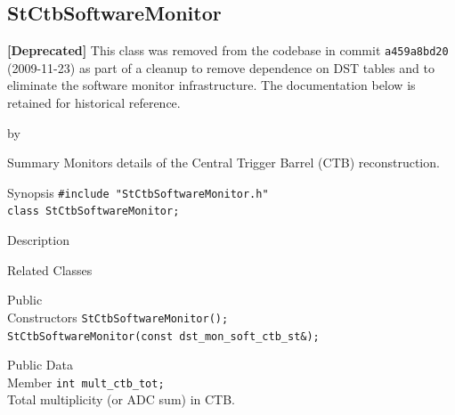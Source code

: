 \documentclass[twoside]{article}
\newcommand{\entrylabel}[1]{\mbox{\textbf{{#1}}}\hfil}%
\newenvironment{entry}
{\begin{list}{}%
    {\renewcommand{\makelabel}{\entrylabel}%
     \setlength{\labelwidth}{90pt}%
     \setlength{\leftmargin}{\labelwidth}
     \advance\leftmargin by \labelsep%
      }%
    }%
  {\end{list}}
\newcommand{\Entrylabel}[1]%
{\raisebox{0pt}[1ex][0pt]{\makebox[\labelwidth][l]%
    {\parbox[t]{\labelwidth}{\hspace{0pt}\textbf{{#1}}}}}}
\newenvironment{Entry}%
{\renewcommand{\entrylabel}{\Entrylabel}\begin{entry}}%
  {\end{entry}}
\begin{document}
\subsection{StCtbSoftwareMonitor}
\label{sec:StCtbSoftwareMonitor}
\textbf{[Deprecated]} This class was removed from the codebase in commit
\texttt{a459a8bd20} (2009-11-23) as part of a cleanup to remove dependence on
DST tables and to eliminate the software monitor infrastructure.
The documentation below is retained for historical reference.

\begin{Entry}
\item[Summary] Monitors details of the Central Trigger Barrel (CTB)
    reconstruction.
\item[Synopsis]
    \verb+#include "StCtbSoftwareMonitor.h"+\\
    \verb+class StCtbSoftwareMonitor;+\\
\item[Description]
\item[Related Classes]
\item[Public\\ Constructors]
    \verb+StCtbSoftwareMonitor();+\\

    \verb+StCtbSoftwareMonitor(const dst_mon_soft_ctb_st&);+\\
\item[Public Data\\ Member]
    \verb+int mult_ctb_tot;+\\
    Total multiplicity (or ADC sum) in CTB.
\end{Entry}
\clearpage
\end{document}
